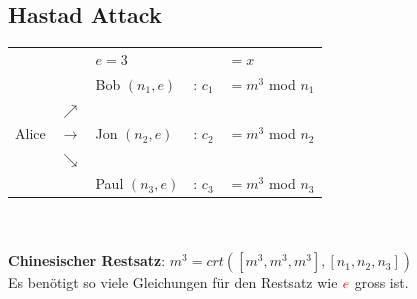 \documentclass[10pt]{article}
\begin{document}
\subsection{Hastad Attack}
\begin{tabular}{l l l l l}
    & & {\color{red} $e=3$} & & $=x$ \\
	&  & Bob $(n_1,e)$ & : {\color{red}$c_1$} & $= m^3$ mod $n_1$\\
	&$\nearrow$  \\
	Alice & $\rightarrow$ & Jon $(n_2,e)$ & : {\color{red}$c_2$} & $= m^3$ mod $n_2$\\
	& $\searrow$ \\
	& & Paul $(n_3,e)$ & : {\color{red}$c_3$} & $= m^3$ mod $n_3$
\end{tabular} \\ \\
\textbf{Chinesischer Restsatz}: $m^3= crt([m^3,m^3,m^3],[n_1,n_2,n_3])$ \\
Es benötigt so viele Gleichungen für den Restsatz wie ${\color{red}e}$ gross ist.
\end{document}
